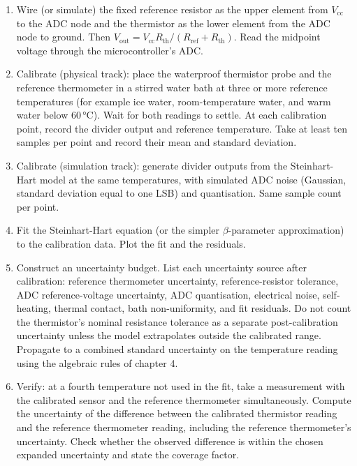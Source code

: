 \begin{project}
\begin{enumerate}[leftmargin=*]
  \item Wire (or simulate) the fixed reference resistor as the
    upper element from $V_{\text{cc}}$ to the ADC node and the
    thermistor as the lower element from the ADC node to ground.
    Then $V_{\text{out}} = V_{\text{cc}} R_{\text{th}} / (R_{\text
    {ref}} + R_{\text{th}})$. Read the midpoint voltage through the
    microcontroller's ADC.
  \item Calibrate (physical track): place the waterproof thermistor
    probe and the reference thermometer in a stirred water bath at
    three or more reference temperatures (for example ice water,
    room-temperature water, and warm water below
    $60 \,\si{\degreeCelsius}$). Wait for both readings to settle.
    At each calibration point, record the divider output and
    reference temperature. Take at least ten samples per point and
    record their mean and standard deviation.
  \item Calibrate (simulation track): generate divider outputs from
    the Steinhart-Hart model at the same temperatures, with
    simulated ADC noise (Gaussian, standard deviation equal to one
    LSB) and quantisation. Same sample count per point.
  \item Fit the Steinhart-Hart equation (or the simpler
    $\beta$-parameter approximation) to the calibration data.
    Plot the fit and the residuals.
  \item Construct an uncertainty budget. List each uncertainty
    source after calibration: reference thermometer uncertainty,
    reference-resistor tolerance, ADC reference-voltage uncertainty,
    ADC quantisation, electrical noise, self-heating, thermal
    contact, bath non-uniformity, and fit residuals. Do not count
    the thermistor's nominal resistance tolerance as a separate
    post-calibration uncertainty unless the model extrapolates
    outside the calibrated range. Propagate to a combined standard
    uncertainty on the temperature reading using the algebraic rules
    of chapter 4.
  \item Verify: at a fourth temperature not used in the fit, take a
    measurement with the calibrated sensor and the reference
    thermometer simultaneously. Compute the uncertainty of the
    difference between the calibrated thermistor reading and the
    reference thermometer reading, including the reference
    thermometer's uncertainty. Check whether the observed difference
    is within the chosen expanded uncertainty and state the coverage
    factor.
\end{enumerate}


\end{project}
